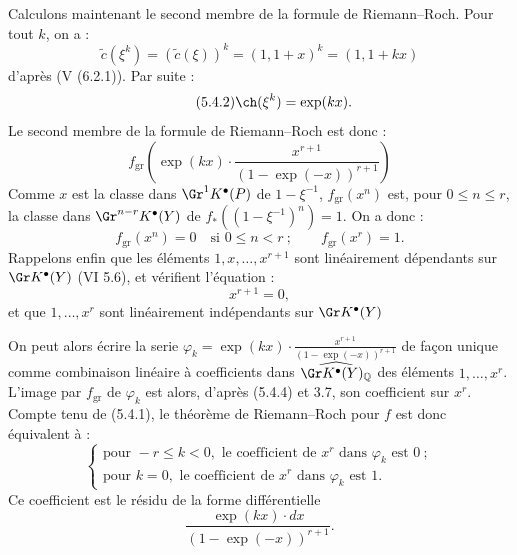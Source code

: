 
Calculons maintenant le second membre de la formule de Riemann--Roch. Pour tout \(k\), on a :
\[
 \widetilde c(\xi^k)=(\widetilde c(\xi))^k=(1,1+x)^k=(1,1+kx)
\]
d'après (V (6.2.1)). Par suite :
\begin{equation}\tag{5.4.2}
 \ch(\xi^k)=\exp(kx).
\end{equation}
Le second membre de la formule de Riemann--Roch est donc :
\begin{equation}\tag{5.4.3}
 f_{\mathrm{gr}}\left(\exp(kx)\cdot
 \frac{x^{r+1}}{(1-\exp(-x))^{r+1}}\right)
\end{equation}
Comme \(x\) est la classe dans \(\Gr^1K^{\bullet}(P)\) de \(1-\xi^{-1}\), \(f_{\mathrm{gr}}(x^n)\) est, pour \(0\leq n\leq r\), la classe dans
\(\Gr^{n-r}K^{\bullet}(Y)\) de \(f_*((1-\xi^{-1})^n)=1\). On a donc :
\begin{equation}\tag{5.4.4}
 f_{\mathrm{gr}}(x^n)=0\quad\text{si }0\leq n<r~;\qquad
 f_{\mathrm{gr}}(x^r)=1.
\end{equation}
Rappelons enfin que les éléments \(1,x,\ldots,x^{r+1}\) sont linéairement dépendants sur \(\Gr K^{\bullet}(Y)\) (VI 5.6), et vérifient l'équation :
\begin{equation}\tag{5.4.5}
 x^{r+1}=0,
\end{equation}
et que \(1,\ldots,x^r\) sont linéairement indépendants sur \(\Gr K^{\bullet}(Y)\)

On peut alors écrire la serie \(\varphi_k=\exp(kx)\cdot\frac{x^{r+1}}{(1-\exp(-x))^{r+1}}\) de façon unique comme combinaison linéaire à coefficients dans
\(\widehat{\Gr K^{\bullet}(Y)_{\mathbb Q}}\) des éléments \(1,\ldots,x^r\). L'image par \(f_{\mathrm{gr}}\) de \(\varphi_k\) est alors, d'après (5.4.4) et 3.7, son coefficient sur \(x^r\). Compte tenu de (5.4.1), le théorème de Riemann--Roch pour \(f\) est donc équivalent à :
\[
\left\{
\begin{array}{ll}
\text{pour }-r\leq k<0,\text{ le coefficient de }x^r\text{ dans }\varphi_k\text{ est }0~;\\
\text{pour }k=0,\text{ le coefficient de }x^r\text{ dans }\varphi_k\text{ est }1.
\end{array}
\right.
\tag{RR}
\]
Ce coefficient est le résidu de la forme différentielle
\[
 \frac{\exp(kx)\cdot dx}{(1-\exp(-x))^{r+1}}.
\]

